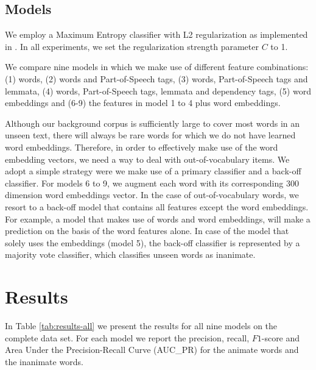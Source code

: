 \documentclass[a4paper,UKenglish]{oasics}
\begin{document}
\subsection{Models}
We employ a Maximum Entropy classifier with L2 regularization as
implemented in \cite{sklearn}. In all experiments, we set the
regularization strength parameter $C$ to 1.

We compare nine models in which we make use of different feature
combinations: (1) words, (2) words and Part-of-Speech tags, (3)
words, Part-of-Speech tags and lemmata, (4) words, Part-of-Speech
tags, lemmata and dependency tags, (5) word embeddings and (6-9) the
features in model 1 to 4 plus word embeddings.

Although our background corpus is sufficiently large to cover most
words in an unseen text, there will always be rare words for which we
do not have learned word embeddings. Therefore, in order to
effectively make use of the word embedding vectors, we need a way to
deal with out-of-vocabulary items. We adopt a simple strategy were we
make use of a primary classifier and a back-off classifier. For models
6 to 9, we augment each word with its corresponding 300 dimension word
embeddings vector. In the case of out-of-vocabulary words, we resort
to a back-off model that contains all features except the word
embeddings. For example, a model that makes use of words and word
embeddings, will make a prediction on the basis of the word features
alone. In case of the model that solely uses the embeddings (model 5),
the back-off classifier is represented by a majority vote classifier,
which classifies unseen words as inanimate.

\section{Results}\label{sec:results}

In Table \ref{tab:results-all} we present the results for all nine
models on the complete data set. For each model we report the
precision, recall, $F1$-score and Area Under the Precision-Recall
Curve (AUC_{PR}) for the animate words and the
inanimate words.
\end{document}
